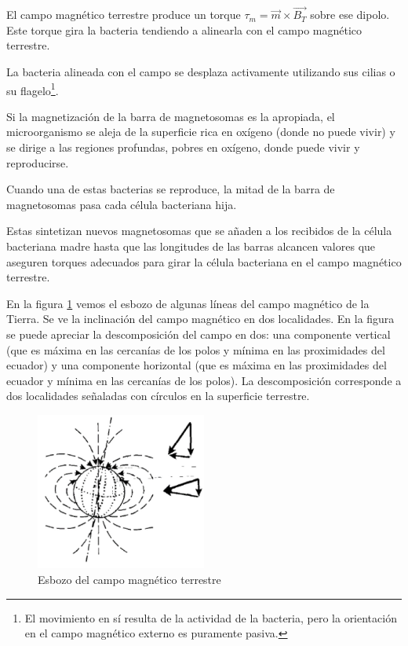 El campo magnético terrestre produce un torque $\tau_{m}=\overrightarrow{m} \times \overrightarrow{B_{T}}$ sobre ese dipolo. 
Este torque gira la bacteria tendiendo a alinearla con el campo magnético terrestre.

La bacteria alineada con el campo se desplaza activamente utilizando sus cilias o su flagelo\footnote{El movimiento en sí resulta de la actividad de la bacteria, pero la orientación en el campo magnético externo es puramente pasiva.}. 

Si la magnetización de la barra de magnetosomas es la apropiada, el microorganismo se aleja de la superficie rica en oxígeno (donde no puede vivir) y se dirige a las regiones profundas, pobres en oxígeno, donde puede vivir y reproducirse.

Cuando una de estas bacterias se reproduce, la mitad de la barra de magnetosomas pasa cada célula bacteriana hija.

Estas sintetizan nuevos magnetosomas que se añaden a los recibidos de la célula bacteriana madre hasta que las longitudes de las barras alcancen valores que aseguren torques adecuados para girar la célula bacteriana en el campo magnético terrestre.


En la figura \ref{fig:63} vemos el esbozo de algunas líneas del campo magnético de la Tierra. Se ve la inclinación del campo magnético en dos localidades. En la figura se puede apreciar la descomposición del campo en dos: una componente vertical (que es máxima en las cercanías de los polos y mínima en las proximidades del ecuador) y una componente horizontal (que es máxima en las proximidades del ecuador y mínima en las cercanías de los polos). La descomposición corresponde a dos localidades señaladas con círculos en la superficie terrestre.

\begin{figure}[H]
    \centering
    \includegraphics[width=0.5\textwidth]{./Figures/fig63}
	\caption{Esbozo del campo magnético terrestre}
	\label{fig:63}
\end{figure}

